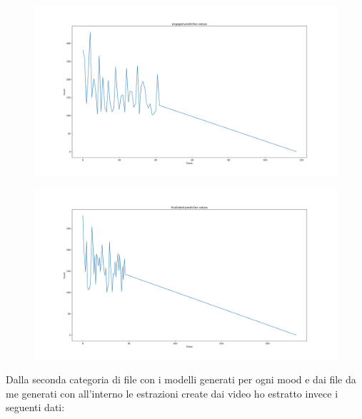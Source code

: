 \begin {itemize}
\begin{figure}
\end{figure}\clearpage
\begin{figure}
    \begin{center}    
        \includegraphics[width=1\linewidth]{images/engaged prediction values.png}
    \end{center}
\end{figure}
\begin{figure}
    \begin{center}    
        \includegraphics[width=1\linewidth]{images/frustrated prediction values.png}
    \end{center}
\end{figure}\clearpage
\end{itemize}
\newpage

Dalla seconda categoria di file con i modelli generati per ogni mood e dai file da me generati con all’interno le estrazioni create dai video ho estratto invece i seguenti dati:



